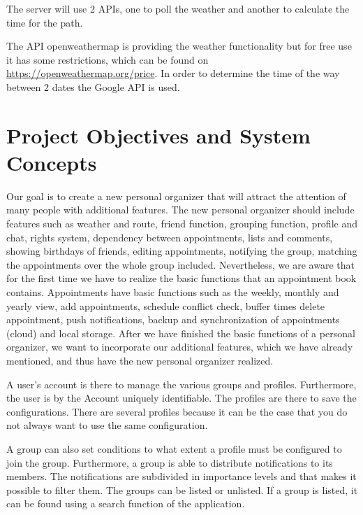 \documentclass[12pt]{scrartcl}
\begin{document}
        The server will use 2 APIs, one to poll the weather and another to calculate the time for the path.

        The API openweathermap is providing the weather functionality 
        but for free use it has some restrictions, which can be found on \href{https://openweathermap.org/price}{https://openweathermap.org/price}.
        In order to determine the time of the way between 2 dates the Google API is used.
        \pagebreak

    \section{Project Objectives and System Concepts}

        Our goal is to create a new personal organizer that will attract the attention of many people with additional features.
        The new personal organizer should include features such as weather and route, friend function, grouping function, 
        profile and chat, rights system, dependency between appointments, lists and comments, showing birthdays of friends,
        editing appointments, notifying the group, matching the appointments over the whole group included.
        Nevertheless, we are aware that for the first time we have to realize the basic functions that an appointment book contains.
        Appointments have basic functions such as the weekly, monthly and yearly view, add appointments, schedule conflict check, buffer times
        delete appointment, push notifications, backup and synchronization of appointments (cloud) and local storage.
        After we have finished the basic functions of a personal organizer, we want to incorporate our additional features, which we have already mentioned, 
        and thus have the new personal organizer realized.

        A user's account is there to manage the various groups and profiles. Furthermore, the user is by the
        Account uniquely identifiable.
        The profiles are there to save the configurations. There are several profiles because it can be the case that you do not always want to use the same configuration.
        
        A group can also set conditions to what extent a profile must be configured to join the group.
        Furthermore, a group is able to distribute notifications to its members. 
        The notifications are subdivided in importance levels and that makes it possible to 
        filter them.
        The groups can be listed or unlisted. If a group is listed, it can be found using a search function of the application.
        
\end{document}
